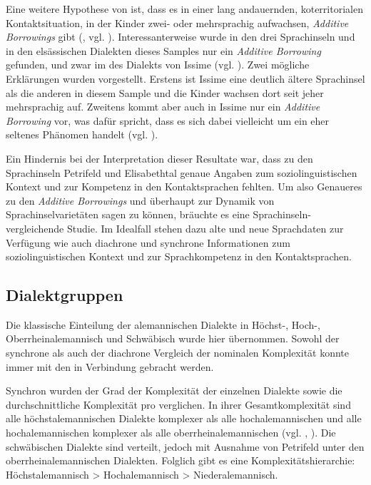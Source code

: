 Eine weitere Hypothese von \citet{Trudgill2011} ist, dass es in einer lang andauernden, koterritorialen Kontaktsituation, in der Kinder zwei- oder mehrsprachig aufwachsen, \textit{Additive Borrowings} gibt (\citealt[34]{Trudgill2011}, vgl. ). Interessanterweise wurde in den drei Sprachinseln und in den elsässischen Dialekten dieses Samples nur ein \textit{Additive Borrowing} gefunden, und zwar im  des Dialekts von Issime (vgl. ). Zwei mögliche Erklärungen wurden vorgestellt. Erstens ist Issime eine deutlich ältere Sprachinsel als die anderen in diesem Sample und die Kinder wachsen dort seit jeher mehrsprachig auf. Zweitens kommt aber auch in Issime nur ein \textit{Additive Borrowing} vor, was dafür spricht, dass es sich dabei vielleicht um ein eher seltenes Phänomen handelt (vgl. ).

Ein Hindernis bei der Interpretation dieser Resultate war, dass zu den Sprachinseln Petrifeld und Elisabethtal genaue Angaben zum soziolinguistischen Kontext und zur Kompetenz in den Kontaktsprachen fehlten. Um also Genaueres zu den \textit{Additive Borrowings} und überhaupt zur Dynamik von Sprachinselvarietäten sagen zu können, bräuchte es eine Sprachinseln-vergleichende Studie. Im Idealfall stehen dazu alte und neue Sprachdaten zur Verfügung wie auch diachrone und synchrone Informationen zum soziolinguistischen Kontext und zur Sprachkompetenz in den Kontaktsprachen.

\subsection{Dialektgruppen}\label{6.6.2}

Die klassische Einteilung der alemannischen Dialekte in Höchst-, Hoch-, Oberrheinalemannisch und Schwäbisch wurde hier übernommen. Sowohl der synchrone als auch der diachrone Vergleich der nominalen Komplexität konnte immer mit den  in Verbindung gebracht werden.

Synchron wurden der Grad der Komplexität der einzelnen Dialekte sowie die durchschnittliche Komplexität pro  verglichen. In ihrer Gesamtkomplexität sind alle höchstalemannischen Dialekte komplexer als alle hochalemannischen und alle hochalemannischen komplexer als alle oberrheinalemannischen (vgl. , ). Die schwäbischen Dialekte sind verteilt, jedoch mit Ausnahme von Petrifeld unter den oberrheinalemannischen Dialekten. Folglich gibt es eine Komplexitätshierarchie: Höchstalemannisch > Hochalemannisch > Niederalemannisch.

